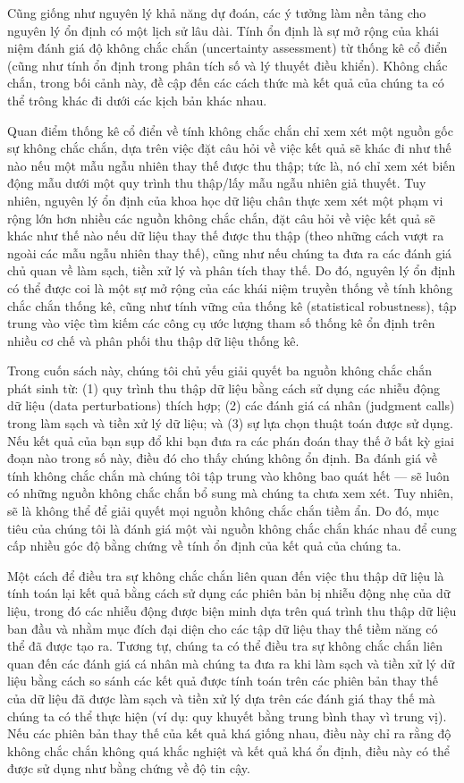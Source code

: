Cũng giống như nguyên lý khả năng dự đoán, các ý tưởng làm nền tảng cho nguyên lý ổn định có một lịch sử lâu dài. Tính ổn định là sự mở rộng của khái niệm đánh giá độ không chắc chắn (uncertainty assessment) từ thống kê cổ điển (cũng như tính ổn định trong phân tích số và lý thuyết điều khiển). Không chắc chắn, trong bối cảnh này, đề cập đến các cách thức mà kết quả của chúng ta có thể trông khác đi dưới các kịch bản khác nhau.

Quan điểm thống kê cổ điển về tính không chắc chắn chỉ xem xét một nguồn gốc sự không chắc chắn, dựa trên việc đặt câu hỏi về việc kết quả sẽ khác đi như thế nào nếu một mẫu ngẫu nhiên thay thế được thu thập; tức là, nó chỉ xem xét biến động mẫu dưới một quy trình thu thập/lấy mẫu ngẫu nhiên giả thuyết. Tuy nhiên, nguyên lý ổn định của khoa học dữ liệu chân thực xem xét một phạm vi rộng lớn hơn nhiều các nguồn không chắc chắn, đặt câu hỏi về việc kết quả sẽ khác như thế nào nếu dữ liệu thay thế được thu thập (theo những cách vượt ra ngoài các mẫu ngẫu nhiên thay thế), cũng như nếu chúng ta đưa ra các đánh giá chủ quan về làm sạch, tiền xử lý và phân tích thay thế. Do đó, nguyên lý ổn định có thể được coi là một sự mở rộng của các khái niệm truyền thống về tính không chắc chắn thống kê, cũng như tính vững của thống kê (statistical robustness), tập trung vào việc tìm kiếm các công cụ ước lượng tham số thống kê ổn định trên nhiều cơ chế và phân phối thu thập dữ liệu thống kê.

Trong cuốn sách này, chúng tôi chủ yếu giải quyết ba nguồn không chắc chắn phát sinh từ: (1) quy trình thu thập dữ liệu bằng cách sử dụng các nhiễu động dữ liệu (data perturbations) thích hợp; (2) các đánh giá cá nhân (judgment calls) trong làm sạch và tiền xử lý dữ liệu; và (3) sự lựa chọn thuật toán được sử dụng. Nếu kết quả của bạn sụp đổ khi bạn đưa ra các phán đoán thay thế ở bất kỳ giai đoạn nào trong số này, điều đó cho thấy chúng không ổn định. Ba đánh giá về tính không chắc chắn mà chúng tôi tập trung vào không bao quát hết — sẽ luôn có những nguồn không chắc chắn bổ sung mà chúng ta chưa xem xét. Tuy nhiên, sẽ là không thể để giải quyết mọi nguồn không chắc chắn tiềm ẩn. Do đó, mục tiêu của chúng tôi là đánh giá một vài nguồn không chắc chắn khác nhau để cung cấp nhiều góc độ bằng chứng về tính ổn định của kết quả của chúng ta.

Một cách để điều tra sự không chắc chắn liên quan đến việc thu thập dữ liệu là tính toán lại kết quả bằng cách sử dụng các phiên bản bị nhiễu động nhẹ của dữ liệu, trong đó các nhiễu động được biện minh dựa trên quá trình thu thập dữ liệu ban đầu và nhằm mục đích đại diện cho các tập dữ liệu thay thế tiềm năng có thể đã được tạo ra. Tương tự, chúng ta có thể điều tra sự không chắc chắn liên quan đến các đánh giá cá nhân mà chúng ta đưa ra khi làm sạch và tiền xử lý dữ liệu bằng cách so sánh các kết quả được tính toán trên các phiên bản thay thế của dữ liệu đã được làm sạch và tiền xử lý dựa trên các đánh giá thay thế mà chúng ta có thể thực hiện (ví dụ: quy khuyết bằng trung bình thay vì trung vị). Nếu các phiên bản thay thế của kết quả khá giống nhau, điều này chỉ ra rằng độ không chắc chắn không quá khắc nghiệt và kết quả khá ổn định, điều này có thể được sử dụng như bằng chứng về độ tin cậy.


